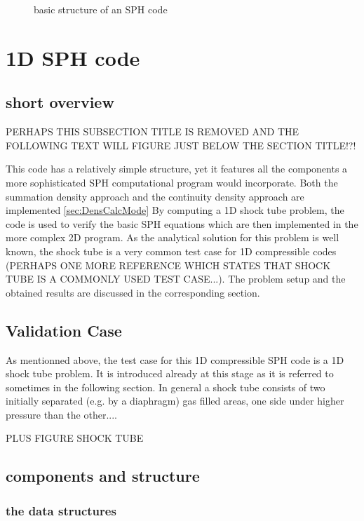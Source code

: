 \documentclass{report}
\begin{document}
\begin{figure}[h]
  \centering
  \caption{basic structure of an SPH code}
  \label{fig:BasicSphCode}
\end{figure}

\section{1D SPH code}

\subsection{short overview}
PERHAPS THIS SUBSECTION TITLE IS REMOVED AND THE FOLLOWING TEXT WILL FIGURE JUST BELOW THE SECTION TITLE!?!

This code has a relatively simple structure, yet it features all the components a more sophisticated SPH computational program would incorporate. Both the summation density approach and the continuity density approach are implemented \ref{sec:DensCalcMode} By computing a 1D shock tube problem, the code is used to verify the basic SPH equations which are then implemented in the more complex 2D program. As the analytical solution for this problem is well known, the shock tube is a very common test case for 1D compressible codes \cite{Sod1978} (PERHAPS ONE MORE REFERENCE WHICH STATES THAT SHOCK TUBE IS A COMMONLY USED TEST CASE...). The problem setup and the obtained results are discussed in the corresponding section.

\subsection{Validation Case}
As mentionned above, the test case for this 1D compressible SPH code is a 1D shock tube problem. It is introduced already at this stage as it is referred to sometimes in the following section.
In general a shock tube consists of two initially separated (e.g. by a diaphragm) gas filled areas, one side under higher pressure than the other....

PLUS FIGURE SHOCK TUBE

\subsection{components and structure}


\subsubsection{the data structures}
\end{document}

